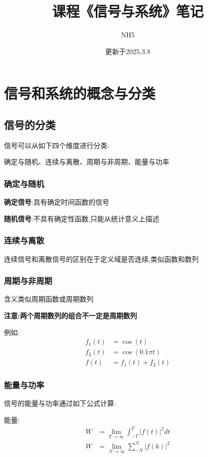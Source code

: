 \documentclass[12pt, a4paper, oneside]{ctexart}
\title{课程《信号与系统》笔记}
\author{NH5}
\date{更新于2025.3.8}
\begin{document}
\maketitle

\section{信号和系统的概念与分类}
\subsection{信号的分类}
信号可以从如下四个维度进行分类:

确定与随机、连续与离散、周期与非周期、能量与功率

\subsubsection{确定与随机}
\textbf{确定信号}:具有确定时间函数的信号

\textbf{随机信号}:不具有确定性函数,只能从统计意义上描述

\subsubsection{连续与离散}
连续信号和离散信号的区别在于定义域是否连续,类似函数和数列

\subsubsection{周期与非周期}
含义类似周期函数或周期数列

\textbf{注意:两个周期数列的组合不一定是周期数列}

例如:
\begin{align*}
    f_1(t) &= \cos (t)\\
    f_2(t) &= \cos (0.1 \pi t)\\
    f(t) &= f_1(t) + f_2(t)
\end{align*}

\subsubsection{能量与功率}
信号的能量与功率通过如下公式计算:

能量:
\begin{align*}
    W &= \lim_{T \to \infty}\int_{-T}^{T} |f(t)|^2 dt\\
    W &= \lim_{N \to \infty}\sum_{-N}^{N}|f(k)|^2
\end{align*}
\end{document}
